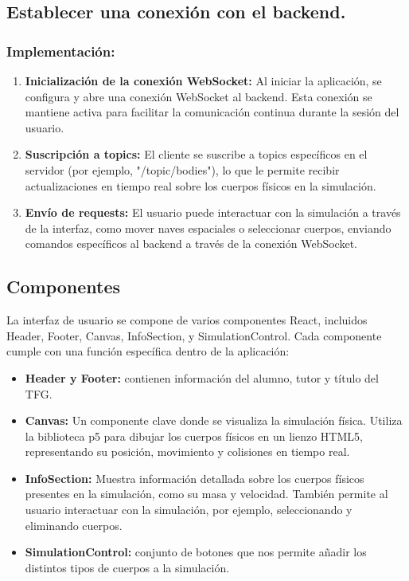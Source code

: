 \subsection{Establecer una conexión con el backend.}
\subsubsection{\textbf{Implementación:}}
\begin{enumerate}
    \item \textbf{Inicialización de la conexión WebSocket:} Al iniciar la aplicación, se configura y abre una conexión WebSocket al backend. Esta conexión se mantiene activa para facilitar la comunicación continua durante la sesión del usuario.
    \item \textbf{Suscripción a topics:} El cliente se suscribe a topics específicos en el servidor (por ejemplo, "/topic/bodies"), lo que le permite recibir actualizaciones en tiempo real sobre los cuerpos físicos en la simulación.
    \item \textbf{Envío de requests:} El usuario puede interactuar con la simulación a través de la interfaz, como mover naves espaciales o seleccionar cuerpos, enviando comandos específicos al backend a través de la conexión WebSocket.
\end{enumerate}
\subsection{Componentes}
La interfaz de usuario se compone de varios componentes React, incluidos Header, Footer, Canvas, InfoSection, y SimulationControl. Cada componente cumple con una función específica dentro de la aplicación:
\begin{itemize}
    \item \textbf{Header y Footer:} contienen información del alumno, tutor y título del TFG.
    \item \textbf{Canvas:} Un componente clave donde se visualiza la simulación física. Utiliza la biblioteca p5 para dibujar los cuerpos físicos en un lienzo HTML5, representando su posición, movimiento y colisiones en tiempo real.
    \item \textbf{InfoSection:} Muestra información detallada sobre los cuerpos físicos presentes en la simulación, como su masa y velocidad. También permite al usuario interactuar con la simulación, por ejemplo, seleccionando y eliminando cuerpos.
    \item \textbf{SimulationControl:} conjunto de botones que nos permite añadir los distintos tipos de cuerpos a la simulación.
\end{itemize}
